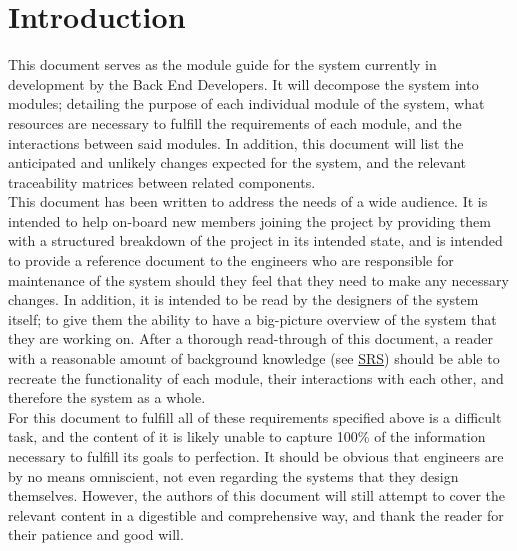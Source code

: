 \documentclass[12pt, titlepage]{article}
\begin{document}
\newpage

\tableofcontents

\listoftables

\listoffigures

\newpage


\section{Introduction}

This document serves as the module guide for the system currently in development by the Back End Developers. It will decompose the system into modules; detailing the purpose of each individual module of the system, what resources are necessary to fulfill the requirements of each module, and the interactions between said modules. In addition, this document will list the anticipated and unlikely changes expected for the system, and the relevant traceability matrices between related components. \\

This document has been written to address the needs of a wide audience. It is intended to help on-board new members joining the project by providing them with a structured breakdown of the project in its intended state, and is intended to provide a reference document to the engineers who are responsible for maintenance of the system should they feel that they need to make any necessary changes. In addition, it is intended to be read by the designers of the system itself; to give them the ability to have a big-picture overview of the system that they are working on. After a thorough read-through of this document, a reader with a reasonable amount of background knowledge (see \href{https://github.com/zakerl/Capstone_Project/blob/main/docs/Design/SystDesign/SystDes.pdf}{SRS}) should be able to recreate the functionality of each module, their interactions with each other, and therefore the system as a whole.\\

For this document to fulfill all of these requirements specified above is a difficult task, and the content of it is likely unable to capture 100\% of the information necessary to fulfill its goals to perfection. It should be obvious that engineers are by no means omniscient, not even regarding the systems that they design themselves. However, the authors of this document will still attempt to cover the relevant content in a digestible and comprehensive way, and thank the reader for their patience and good will.\\
\end{document}
